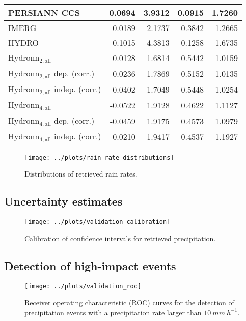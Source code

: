 \documentclass[journal abbreviation, manuscript]{copernicus}
\begin{document}
{\begin{table}
\begin{tabular}{|l||r|r|r|r|}
PERSIANN CCS & 0.0694 & 3.9312 & 0.0915 & 1.7260 \\ 
\hline
IMERG & 0.0189 & 2.1737 & 0.3842 & 1.2665 \\ 
\hline
HYDRO & 0.1015 & 4.3813 & 0.1258 & 1.6735 \\ 
\hline
Hydronn$_{2, \text{all}}$ & 0.0128 & 1.6814 & 0.5442 & 1.0159 \\ 
\hline
Hydronn$_{2, \text{all}}$ dep. (corr.) & -0.0236 & 1.7869 & 0.5152 & 1.0135 \\ 
\hline
Hydronn$_{2, \text{all}}$ indep. (corr.) & 0.0402 & 1.7049 & 0.5448 & 1.0254 \\ 
\hline
Hydronn$_{4, \text{all}}$ & -0.0522 & 1.9128 & 0.4622 & 1.1127 \\ 
\hline
Hydronn$_{4, \text{all}}$ dep. (corr.) & -0.0459 & 1.9175 & 0.4573 & 1.0979 \\ 
\hline
Hydronn$_{4, \text{all}}$ indep. (corr.) & 0.0210 & 1.9417 & 0.4537 & 1.1927 \\ 
\hline
\end{tabular}
\end{table}

\begin{figure}
  \centering
  \texttt{[image: ../plots/rain\_rate\_distributions]}
  \caption{
    Distributions of retrieved rain rates.
    }
  \label{fig:evaluation_scatter}
\end{figure}

\subsection{Uncertainty estimates}

\begin{figure}
  \centering
  \texttt{[image: ../plots/validation\_calibration]}
  \caption{
    Calibration of confidence intervals for retrieved precipitation.
    }
  \label{fig:evaluation_scatter}
\end{figure}

\subsection{Detection of high-impact events}

\begin{figure}
  \centering
  \texttt{[image: ../plots/validation\_roc]}
  \caption{
    Receiver operating characteristic (ROC) curves for the detection of precipitation
    events with a precipitation rate larger than $10\ \unit{mm\ h^{-1}}$.
    }
  \label{fig:evaluation_scatter}
\end{figure}

}
\end{document}

